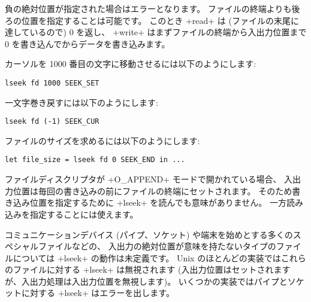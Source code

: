 負の絶対位置が指定された場合はエラーとなります。
ファイルの終端よりも後ろの位置を指定することは可能です。
このとき \ml+read+ は (ファイルの末尾に達しているので) 0 を返し、
\ml+write+ はまずファイルの終端から入出力位置まで 0 を書き込んでからデータを書き込みます。

\begin{example}
カーソルを 1000 番目の文字に移動させるには以下のようにします:
%
\begin{lstlisting}
lseek fd 1000 SEEK_SET
\end{lstlisting}
%
一文字巻き戻すには以下のようにします:
%
\begin{lstlisting}
lseek fd (-1) SEEK_CUR
\end{lstlisting}
%
ファイルのサイズを求めるには以下のようにします:
%
\begin{lstlisting}
let file_size = lseek fd 0 SEEK_END in ...
\end{lstlisting}
\end{example}

ファイルディスクリプタが \ml+O_APPEND+ モードで開かれている場合、
入出力位置は毎回の書き込みの前にファイルの終端にセットされます。
そのため書き込み位置を指定するために \ml+lseek+ を読んでも意味がありません。
一方読み込みを指定することには使えます。

コミュニケーションデバイス (パイプ、ソケット) や端末を始めとする多くのスペシャルファイルなどの、
入出力の絶対位置が意味を持たないタイプのファイルについては \ml+lseek+ の動作は未定義です。
Unix のほとんどの実装ではこれらのファイルに対する \ml+lseek+ は無視されます
(入出力位置はセットされますが、入出力処理は入出力位置を無視します)。
いくつかの実装ではパイプとソケットに対する \ml+lseek+ はエラーを出します。

